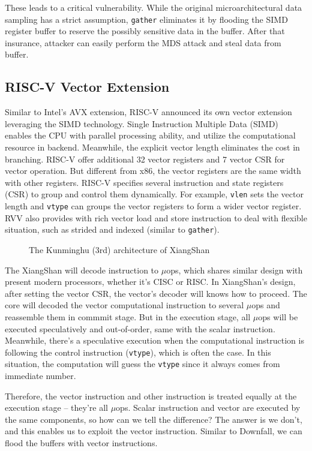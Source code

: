 These leads to a critical vulnerability. While the original microarchitectural data sampling has a strict assumption, \verb|gather| eliminates it
by flooding the SIMD register buffer to reserve the possibly sensitive data in the buffer. After that insurance, attacker can easily
perform the MDS attack and steal data from buffer.

\subsection{RISC-V Vector Extension}
Similar to Intel's AVX extension, RISC-V announced its own vector extension leveraging the SIMD technology. Single Instruction Multiple Data (SIMD) 
enables the CPU with parallel processing ability, and utilize the computational resource in backend. Meanwhile, the explicit vector length eliminates
the cost in branching. RISC-V offer additional 32 vector registers and 7 vector CSR for vector operation. But different from x86, the vector registers are the same width with other registers. RISC-V specifies several instruction and state registers (CSR) to group and control them dynamically. For example, \verb|vlen| sets the vector length and \verb|vtype| can groups the vector registers to form a wider vector register. RVV also provides with
rich vector load and store instruction to deal with flexible situation, such as strided and indexed (similar to \verb|gather|).

\begin{figure}[!htbp]
    \centering
    
    \caption{The Kunminghu (3rd) architecture of XiangShan}
\end{figure}

The XiangShan will decode instruction to $\mu$ops, which shares similar design with present modern processors, whether it's CISC or RISC. In XiangShan's design, after setting the vector CSR, the vector's decoder will knows how to proceed. The core will decoded the vector computational instruction to several $\mu$ops and reassemble them in commmit stage. But in the execution stage, all $\mu$ops will be executed speculatively and out-of-order, same with the scalar instruction. Meanwhile, there's a speculative execution when the computational instruction is following the control instruction (\verb|vtype|), which is often the case. In this situation, the computation will guess the \verb|vtype| since it always comes from immediate number.

Therefore, the vector instruction and other instruction is treated equally at the execution stage -- they're all $\mu$ops. Scalar instruction and vector 
are executed by the same components, so how can we tell the difference? The answer is we don't, and this enables us to exploit the vector instruction. Similar to Downfall, we can flood the buffers with vector instructions.

